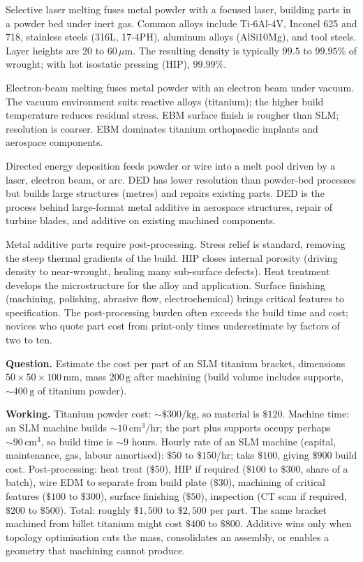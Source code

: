 Selective laser melting fuses metal powder with a focused laser, building parts in a powder bed under inert gas. Common alloys include Ti-6Al-4V, Inconel 625 and 718, stainless steels (316L, 17-4PH), aluminum alloys (AlSi10Mg), and tool steels. Layer heights are $20$ to $60\,\mu\text{m}$. The resulting density is typically $99.5$ to $99.95\%$ of wrought; with hot isostatic pressing (HIP), $99.99\%$.

Electron-beam melting fuses metal powder with an electron beam under vacuum. The vacuum environment suits reactive alloys (titanium); the higher build temperature reduces residual stress. EBM surface finish is rougher than SLM; resolution is coarser. EBM dominates titanium orthopaedic implants and aerospace components.

Directed energy deposition feeds powder or wire into a melt pool driven by a laser, electron beam, or arc. DED has lower resolution than powder-bed processes but builds large structures (metres) and repairs existing parts. DED is the process behind large-format metal additive in aerospace structures, repair of turbine blades, and additive on existing machined components.

Metal additive parts require post-processing. Stress relief is standard, removing the steep thermal gradients of the build. HIP closes internal porosity (driving density to near-wrought, healing many sub-surface defects). Heat treatment develops the microstructure for the alloy and application. Surface finishing (machining, polishing, abrasive flow, electrochemical) brings critical features to specification. The post-processing burden often exceeds the build time and cost; novices who quote part cost from print-only times underestimate by factors of two to ten.

\begin{estimation}
\textbf{Question.} Estimate the cost per part of an SLM titanium bracket, dimensions $50 \times 50 \times 100\,\text{mm}$, mass $200\,\text{g}$ after machining (build volume includes supports, $\sim 400\,\text{g}$ of titanium powder).

\textbf{Working.} Titanium powder cost: $\sim \$300/\text{kg}$, so material is $\$120$. Machine time: an SLM machine builds $\sim 10\,\text{cm}^3/\text{hr}$; the part plus supports occupy perhaps $\sim 90\,\text{cm}^3$, so build time is $\sim 9$ hours. Hourly rate of an SLM machine (capital, maintenance, gas, labour amortised): $\$50$ to $\$150/\text{hr}$; take $\$100$, giving $\$900$ build cost. Post-processing: heat treat ($\$50$), HIP if required ($\$100$ to $\$300$, share of a batch), wire EDM to separate from build plate ($\$30$), machining of critical features ($\$100$ to $\$300$), surface finishing ($\$50$), inspection (CT scan if required, $\$200$ to $\$500$). Total: roughly $\$1{,}500$ to $\$2{,}500$ per part. The same bracket machined from billet titanium might cost $\$400$ to $\$800$. Additive wins only when topology optimisation cuts the mass, consolidates an assembly, or enables a geometry that machining cannot produce.
\end{estimation}


